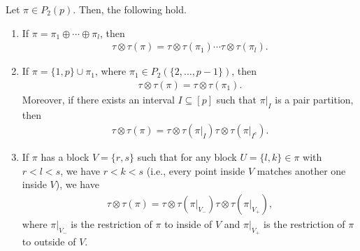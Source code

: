 \documentclass[12pt,reqno]{amsart}
\theoremstyle{plain}
\newcommand{\1}{\mathbf{1}}
\begin{document}
\begin{lemma}\label{lemma: recursion tau(pi)}
Let $\pi \in P_2(p)$. Then, the following hold.
\begin{enumerate}[label=(\ref{lemma: recursion tau(pi)}.\roman*)]
    \item\label{recursion: direct sum} If $\pi=\pi_1 \oplus \cdots \oplus \pi_l$, then
    \begin{align*}
        \tau\otimes \tau(\pi)=\tau\otimes \tau(\pi_1)\cdots \tau\otimes \tau(\pi_l).
    \end{align*}
    \item\label{recursion: superblocks} If $\pi=\{1,p\}\cup \pi_1$, where $\pi_1 \in P_2(\{2,\ldots,p-1\})$, then 
    \begin{align*}
        \tau\otimes \tau(\pi)=\tau\otimes \tau(\pi_1).
    \end{align*}
    Moreover, if there exists an interval $I \subseteq [p]$ such that $\pi|_I$ is a pair partition, then
    \begin{align*}
        \tau\otimes \tau(\pi)=\tau\otimes \tau(\pi|_I)\tau\otimes \tau (\pi|_{I^c}).
    \end{align*}
    \item\label{recursion: superblock with direct sum} If $\pi$ has a block $V=\{r,s\}$ such that for any block $U=\{l,k\} \in \pi$ with $r <l<s$, we have $r<k<s$ (i.e., every point inside $V$ matches another one inside $V$), we have
    \begin{align*}
        \tau\otimes \tau(\pi)=\tau\otimes \tau(\pi|_{V_-})\tau\otimes \tau(\pi|_{V_+}),
    \end{align*}
    where $\pi|_{V_-}$ is the restriction of $\pi$ to inside of $V$ and $\pi|_{V_+}$ is the restriction of $\pi$ to outside of $V$.
\end{enumerate}
\end{lemma}
\end{document}
